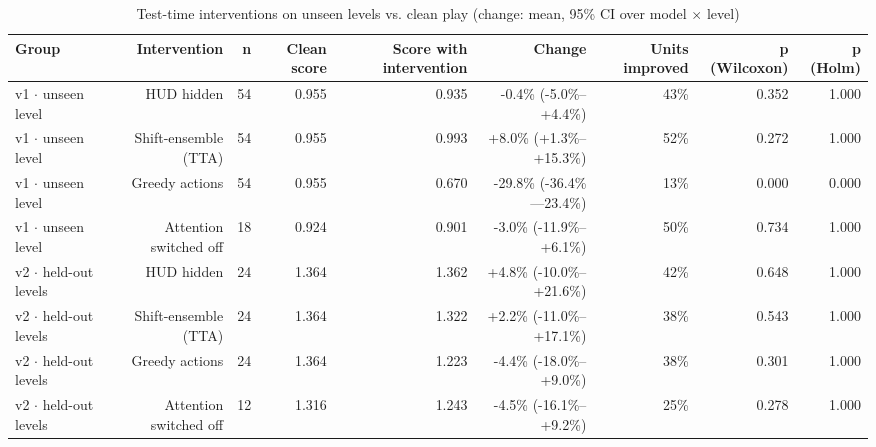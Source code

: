 \begin{table}[t]
\centering
\caption{Test-time interventions on unseen levels vs. clean play (change: mean, 95\% CI over model $\times$ level)}
\label{tab:test_time_interventions}
\begin{tabular}{lrrrrrrrr}
\toprule
Group & Intervention & n & Clean score & Score with intervention & Change & Units improved & p (Wilcoxon) & p (Holm) \\
\midrule
v1 $\cdot$ unseen level & HUD hidden & 54 & 0.955 & 0.935 & -0.4\% (-5.0\%--+4.4\%) & 43\% & 0.352 & 1.000 \\
v1 $\cdot$ unseen level & Shift-ensemble (TTA) & 54 & 0.955 & 0.993 & +8.0\% (+1.3\%--+15.3\%) & 52\% & 0.272 & 1.000 \\
v1 $\cdot$ unseen level & Greedy actions & 54 & 0.955 & 0.670 & -29.8\% (-36.4\%---23.4\%) & 13\% & 0.000 & 0.000 \\
v1 $\cdot$ unseen level & Attention switched off & 18 & 0.924 & 0.901 & -3.0\% (-11.9\%--+6.1\%) & 50\% & 0.734 & 1.000 \\
v2 $\cdot$ held-out levels & HUD hidden & 24 & 1.364 & 1.362 & +4.8\% (-10.0\%--+21.6\%) & 42\% & 0.648 & 1.000 \\
v2 $\cdot$ held-out levels & Shift-ensemble (TTA) & 24 & 1.364 & 1.322 & +2.2\% (-11.0\%--+17.1\%) & 38\% & 0.543 & 1.000 \\
v2 $\cdot$ held-out levels & Greedy actions & 24 & 1.364 & 1.223 & -4.4\% (-18.0\%--+9.0\%) & 38\% & 0.301 & 1.000 \\
v2 $\cdot$ held-out levels & Attention switched off & 12 & 1.316 & 1.243 & -4.5\% (-16.1\%--+9.2\%) & 25\% & 0.278 & 1.000 \\
\bottomrule
\end{tabular}
\end{table}
